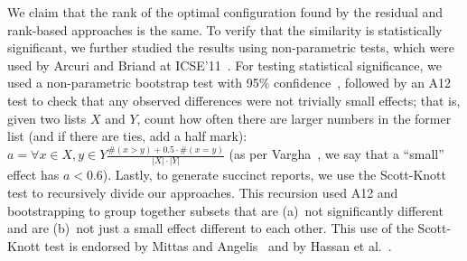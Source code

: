 We claim that the rank of the optimal configuration found by the residual and rank-based approaches is the same. To verify that the similarity is statistically significant, we further studied the results using non-parametric tests, which were used by Arcuri and Briand at ICSE'11~\cite{mittas13}. For testing statistical significance,
we used a non-parametric bootstrap test with 95\% confidence~\cite{efron93}, followed by
an A12 test to check that any observed differences were not trivially small effects;
that is, given two lists $X$ and $Y$, count how often there are larger
numbers in the former list (and if there are ties, add a half mark):
$a=\forall x\in X, y\in Y\frac{\#(x>y) + 0.5\cdot\#(x=y)}{|X|\cdot|Y|}$
(as per Vargha~\cite{Vargha00}, we say that a ``small'' effect has $a <0.6$). 
Lastly, to generate succinct reports, we use the Scott-Knott test to recursively
divide our approaches. This recursion used A12 and bootstrapping  
to group together subsets that are (a)~not significantly different and are (b)~not
just a small effect different to each other. This use of the Scott-Knott test is endorsed
by Mittas and Angelis~\cite{mittas13}
and by Hassan et al.~\cite{7194626}.





